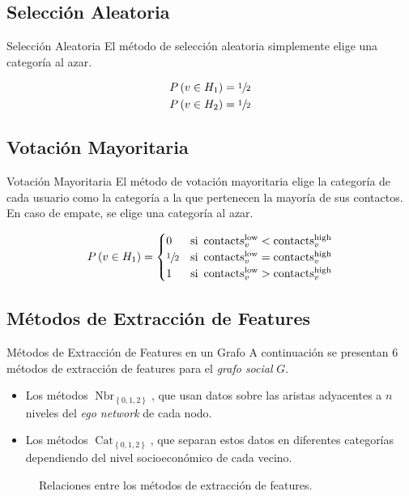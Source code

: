 \documentclass[usenames,dvipsnames,table]{beamer}
\DeclareMathOperator{\contacts}{contacts}
\DeclareMathOperator{\low}{low}
\DeclareMathOperator{\high}{high}
\DeclareMathOperator{\ego}{Nbr}
\DeclareMathOperator{\cat}{Cat}
\begin{document}
\subsection{Selección Aleatoria}

\begin{frame}{Selección Aleatoria}
	El método de selección aleatoria simplemente elige una categoría al azar.

	\begin{align*}
		P \left( v \in H_1 \right) &= \sfrac{1}{2} \\
		P \left( v \in H_2 \right) &= \sfrac{1}{2}
	\end{align*}
\end{frame}

\subsection{Votación Mayoritaria}
\begin{frame}{Votación Mayoritaria}
	El método de votación mayoritaria elige la categoría de cada usuario como la categoría a la que pertenecen la mayoría de sus contactos. En caso de empate, se elige una categoría al azar.

	\begin{equation*}
		P \left( v \in H_1 \right) =
		\begin{cases}
			0            & \text{si} \ \contacts^{\low}_{v} < \contacts^{\high}_{v} \\
			\sfrac{1}{2} & \text{si} \ \contacts^{\low}_{v} = \contacts^{\high}_{v} \\
			1            & \text{si} \ \contacts^{\low}_{v} > \contacts^{\high}_{v}
		\end{cases}
	\end{equation*}
\end{frame}

\subsection{Métodos de Extracción de Features}
\begin{frame}{Métodos de Extracción de Features en un Grafo}
	A continuación se presentan 6 métodos de extracción de features para el \emph{grafo social} $G$.
	\begin{itemize}
		\item Los métodos $\ego_{\left\{0, 1, 2\right\}}$, que usan datos sobre las aristas adyacentes a $n$ niveles del \emph{ego network} de cada nodo.
		\item Los métodos $\cat_{\left\{0, 1, 2\right\}}$, que separan estos datos en diferentes categorías dependiendo del nivel socioeconómico de cada vecino.
	\end{itemize}

	\begin{figure}
		\resizebox{!}{.4\textheight}{%
			\framebox{%
				
			}
		}
		\caption{Relaciones entre los métodos de extracción de features.}
	\end{figure}
\end{frame}
\end{document}
